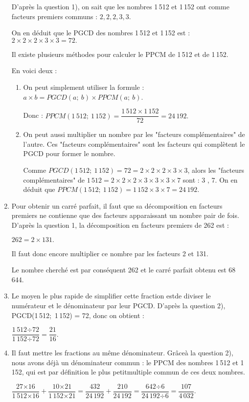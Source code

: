 \documentclass[a4paper,11pt]{article}
\begin{document}
\begin{enumerate}
    D'après la question 1), on sait que les nombres 1\,512 et 1\,152 ont comme
    facteurs premiers communs :
    $2 , 2 , 2 , 3 , 3$.\par
    On en déduit que le PGCD des nombres 1\,512 et 1\,152 est :
    $2 \times 2 \times 2 \times 3 \times 3 = 72.$\par
    Il existe plusieurs méthodes pour calculer le PPCM de 1\,512 et de
    1\,152.\par
    En voici deux :
    \begin{enumerate}
    \item On peut simplement utiliser la formule :
      $a \times b = PGCD(a;~b) \times PPCM(a;~b)$.\par
      Donc : $PPCM(1\,512;~1\,152) = \dfrac{1\,512\times1\,152}{72} = 24\,192.$
    \item On peut aussi multiplier un nombre par les "facteurs complémentaires"
      de l'autre.
      Ces "facteurs complémentaires" sont les facteurs qui complètent le PGCD
      pour former le nombre.\par
      Comme $PGCD(1\,512;~1\,152) = 72 = 2 \times 2 \times 2 \times 3 \times
      3$, alors les "facteurs complémentaires" de $1\,512 = 2 \times 2 \times 2
      \times 3 \times 3 \times 3 \times 7$ sont : 3 , 7.
      On en déduit que $PPCM(1\,512;~1\,152) = 1\,152 \times 3 \times 7 =
      24\,192.$
    \end{enumerate}
  \item Pour obtenir un carré parfait, il faut que sa décomposition en facteurs
    premiers ne contienne que des facteurs apparaissant un nombre pair de fois.
    D'après la question 1, la décomposition en facteurs premiers de 262
    est : \par
    $262 = 2 \times 131.$\par
    Il faut donc encore multiplier ce nombre par
    les facteurs
    2 et
    131.\par
    Le nombre cherché est par conséquent 262 et le carré parfait obtenu est
    68\,644.
  \item Le moyen le plus rapide de simplifier cette fraction estde diviser le
    numérateur et le dénominateur par leur PGCD. D'après la question 2), 
    PGCD(1\,512;~1\,152) = 72, donc on obtient :\par
    $\dfrac{1\,512{\scriptstyle \div 72}}{1\,152{\scriptstyle \div 72}} =
    \dfrac{21}{16}.$
  \item Il faut mettre les fractions au même dénominateur. Grâceà la question
    2), nous avons déjà un dénominateur commun : le PPCM des nombres 1\,512 et
    1\,152, qui est par définition le plus petitmultiple commun de ces deux
    nombres.\par
    $\dfrac{27{\scriptstyle \times 16}}{1\,512{\scriptstyle \times 16}} +
    \dfrac{10{\scriptstyle \times 21}}{1\,152{\scriptstyle \times 21}} =
    \dfrac{432}{24\,192} + \dfrac{210}{24\,192} = \dfrac{642{\scriptstyle \div
        6}}{24\,192{\scriptstyle \div 6}} = \dfrac{107}{4\,032}.$
  \end{enumerate}
\end{document}
